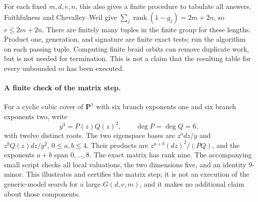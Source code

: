 For each fixed $m,d,e,n$, this also gives a finite procedure to tabulate
all answers.  Faithfulness and Chevalley--Weil give
$\sum_j\operatorname{rank}(1-g_j)=2m+2n$, so $r\le2m+2n$.
There are finitely many tuples in the finite group for these lengths.
Product one, generation, and signature are finite exact tests; run the
algorithm on each passing tuple.  Computing finite braid orbits can remove
duplicate work, but is not needed for termination.  This is not a claim
that the resulting table for every unbounded $m$ has been executed.

\paragraph{A finite check of the matrix step.}
For a cyclic cubic cover of $\mathbf P^1$ with six branch exponents one
and six branch exponents two, write
\[
 y^3=P(z)Q(z)^2,\qquad \deg P=\deg Q=6,
\]
with twelve distinct roots.  The two eigenspace bases are
$z^a dz/y$ and $z^bQ(z)dz/y^2$, $0\le a,b\le4$.
Their products are $z^{a+b}(dz)^2/(PQ)$, and the exponents $a+b$
span $0,\ldots,8$.  The exact matrix has rank nine.  The accompanying
small script checks all local valuations, the two dimensions five, and
an identity $9$-minor.  This illustrates and certifies the matrix step;
it is not an execution of the generic-model search for a large
$G(d,e,m)$, and it makes no additional claim about those components.
